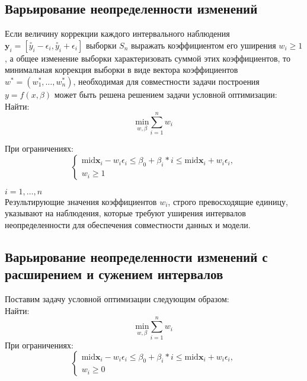 \subsection{Варьирование неопределенности изменений} 

Если величину коррекции каждого интервального наблюдения $\bm{y}_i = [\stackrel{\circ}{y}_i - \epsilon_i, \stackrel{\circ}{y}_i + \epsilon_i]$ выборки $S_n$ выражать коэффициентом его уширения $w_i \geq 1$, а общее изменение выборки характеризовать суммой этих коэффициентов, то минимальная коррекция выборки в виде вектора коэффициентов $w^* = (w_{1}^*, \ldots, w_{n}^{*})$, необходимая для совместности задачи построения $y=f(x, \beta)$ может быть решена решением задачи условной оптимизации: \\

Найти: \\
\begin{equation}
	\underset {w, \beta}{\text{min}} \sum\limits_{i=1}^{n} w_i
\end{equation}

При ограничениях: \\

\begin{equation}
	\begin{cases}
		\text{mid} \bm{x}_i - w_i \epsilon_i \leq \beta_0 + \beta_i * i \leq \text{mid} \bm{x}_i + w_i \epsilon_i, \\
		w_i \geq 1 
	\end{cases}
\end{equation}

$i = 1, \ldots, n$ \\

Результирующие значения коэффициентов $w_i$, строго превосходящие единицу, указывают на наблюдения, которые требуют уширения интервалов неопределенности для обеспечения совместности данных и модели. \\

\subsection{Варьирование неопределенности изменений с расширением и сужением интервалов} 

Поставим задачу условной оптимизации следующим образом:\\
Найти: \\
\begin{equation}
	\underset {w, \beta}{\text{min}} \sum\limits_{i=1}^{n} w_i
\end{equation}
При ограничениях: \\
\begin{equation}
	\begin{cases}
		\text{mid} \bm{x}_i - w_i \epsilon_i \leq \beta_0 + \beta_i * i \leq \text{mid} \bm{x}_i + w_i \epsilon_i, \\
		w_i \geq 0 
	\end{cases}
\end{equation}

